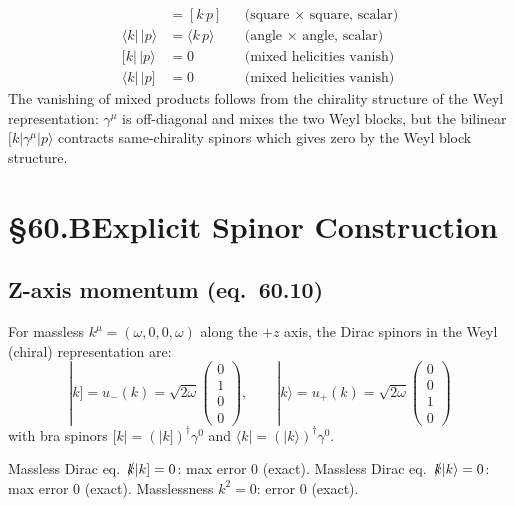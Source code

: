 \documentclass[12pt]{article}
\newcommand{\verified}[1]{\textcolor{verifygreen}{\checkmark\; #1}}
\begin{document}
\begin{align}
  [k|\,|p] &= [k\,p] && \text{(square × square, scalar)} \\
  \langle k|\,|p\rangle &= \langle k\,p\rangle && \text{(angle × angle, scalar)} \\
  [k|\,|p\rangle &= 0 && \text{(mixed helicities vanish)} \\
  \langle k|\,|p] &= 0 && \text{(mixed helicities vanish)}
\end{align}
The vanishing of mixed products follows from the chirality structure of the
Weyl representation: $\gamma^\mu$ is off-diagonal and mixes the two Weyl
blocks, but the bilinear $[k|\gamma^\mu|p\rangle$ contracts same-chirality
spinors which gives zero by the Weyl block structure.

\section{§60.B\quad Explicit Spinor Construction}

\subsection{Z-axis momentum (eq.~60.10)}

For massless $k^\mu=(\omega,0,0,\omega)$ along the $+z$ axis, the
Dirac spinors in the Weyl (chiral) representation are:
\begin{equation}
  \boxed{
    |k] = u_-(k) = \sqrt{2\omega}\begin{pmatrix}0\\1\\0\\0\end{pmatrix},
    \qquad
    |k\rangle = u_+(k) = \sqrt{2\omega}\begin{pmatrix}0\\0\\1\\0\end{pmatrix}
  }
  \tag{60.10}
\end{equation}
with bra spinors $[k| = (|k])^\dagger\gamma^0$ and
$\langle k| = (|k\rangle)^\dagger\gamma^0$.

\verified{Massless Dirac eq.\ $\slashed{k}|k] = 0$: max error $0$ (exact).}
\verified{Massless Dirac eq.\ $\slashed{k}|k\rangle = 0$: max error $0$ (exact).}
\verified{Masslessness $k^2 = 0$: error $0$ (exact).}
\end{document}
